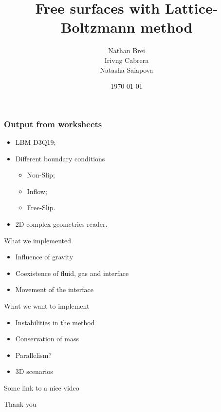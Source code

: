 \documentclass[10pt,a4paper]{beamer}
\author{ Nathan Brei \\ Irivng Cabrera \\ Natasha Saiapova}
\institute[TUM]{TU München}
\date{\today}
\title{Free surfaces with Lattice-Boltzmann method}
\begin{document}
\begin{frame}
	\maketitle
\end{frame}
\begin{frame}
	\tableofcontents
\end{frame}
\begin{frame}
	\frametitle{Output from worksheets}
	\begin{itemize}
	\item LBM D3Q19;
	\item Different boundary conditions
		\begin{itemize}
		\item Non-Slip;  
		\item Inflow;
		\item Free-Slip.
		\end{itemize}
	\item 2D complex geometries reader.
	\end{itemize}
\end{frame}
\begin{frame}
	What we implemented
	\begin{itemize}
	\item Influence of gravity
	\item Coexistence of fluid, gas and interface 
	\item Movement of the interface
	\end{itemize}
\end{frame}
\begin{frame}
	What we want to implement
	\begin{itemize}
	\item Instabilities in the method
	\item Conservation of mass
	\item Parallelism?
	\item 3D scenarios
	\end{itemize}
\end{frame}
\begin{frame}
	Some link to a nice video
\end{frame}
\begin{frame}
Thank you
\end{frame}
\end{document}
